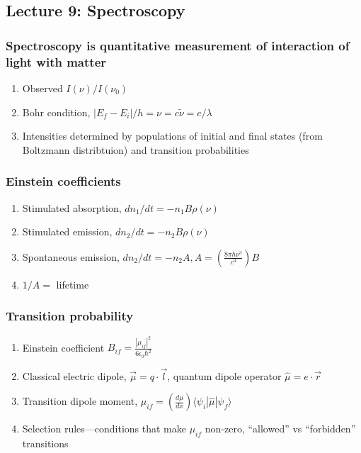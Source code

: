 \documentclass[11pt]{article}
\begin{document}
\subsection{Lecture 9: Spectroscopy}
\label{sec:org5f53a57}
\subsubsection{Spectroscopy is quantitative measurement of interaction of light with matter}
\label{sec:orge6f6727}
\begin{enumerate}
\item Observed \(I(\nu)/I(\nu_0)\)
\item Bohr condition, \(|E_f-E_i|/h=\nu =c\tilde{\nu}=c/\lambda\)
\item Intensities determined by populations of initial and final states (from Boltzmann distribtuion) and transition probabilities
\end{enumerate}
\subsubsection{Einstein coefficients}
\label{sec:org3131617}
\begin{enumerate}
\item Stimulated absorption, \(dn_1/dt= -n_1 B\rho(\nu)\)
\item Stimulated emission, \(dn_2/dt= -n_2 B\rho(\nu)\)
\item Spontaneous emission, \(dn_2/dt=-n_2 A, A=\left ( \frac{8\pi h
              \nu^3}{c^3}\right )B\)
\item \(1/A=\) lifetime
\end{enumerate}
\subsubsection{Transition probability}
\label{sec:org30a7855}
\begin{enumerate}
\item Einstein coefficient \(B_{if}=\frac{|\mu_{if}|^2}{6\epsilon_0\hbar^2}\)
\item Classical electric dipole, \(\overrightarrow{\mu}=q \cdot
          \overrightarrow{l}\), quantum dipole operator \(\hat\mu = e\cdot \overrightarrow{r}\)
\item Transition dipole moment, \(\mu_{if} = \left(
        \frac{d\mu}{dx}\right ) \langle \psi_i|\hat\mu |\psi_f \rangle\)
\item Selection rules---conditions that make \(\mu_{if}\) non-zero,
``allowed'' vs ``forbidden'' transitions
\end{enumerate}
\end{document}
